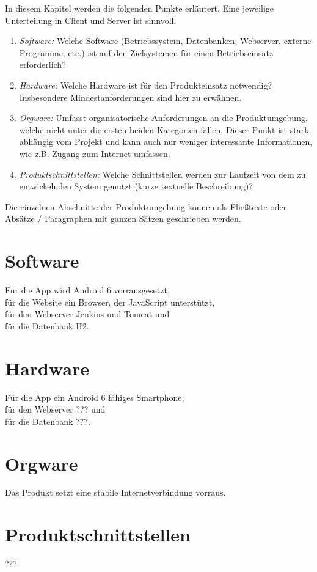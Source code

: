 \begin{tcolorbox}
In diesem Kapitel werden die folgenden Punkte erläutert. Eine jeweilige Unterteilung in Client und Server ist sinnvoll.
\begin{enumerate}
	\item \textit{Software:} Welche Software (Betriebssystem, Datenbanken, Webserver, externe Programme, etc.) ist auf den Zielsystemen für einen Betriebseinsatz erforderlich?
	\item \textit{Hardware:} Welche Hardware ist für den Produkteinsatz notwendig? Insbesondere Mindestanforderungen sind hier zu erwähnen.
	\item \textit{Orgware:} Umfasst organisatorische Anforderungen an die Produktumgebung, welche nicht unter die ersten beiden Kategorien fallen. 
	Dieser Punkt ist stark abhängig vom Projekt und kann auch nur weniger interessante Informationen, wie z.B. Zugang zum Internet umfassen.
	\item \textit{Produktschnittstellen:} Welche Schnittstellen werden zur Laufzeit von dem zu entwickelnden System genutzt (kurze textuelle Beschreibung)?
\end{enumerate}

\noindent Die einzelnen Abschnitte der Produktumgebung können als Fließtexte oder Absätze / Paragraphen mit ganzen Sätzen geschrieben werden.
\end{tcolorbox}

\section{Software}

Für die App wird Android 6 vorrausgesetzt, \\
für die Website ein Browser, der JavaScript unterstützt, \\
für den Webserver Jenkins und Tomcat und \\
für die Datenbank H2.\\

\section{Hardware}

Für die App ein Android 6 fähiges Smartphone, \\
für den Webserver ??? und \\
für die Datenbank ???.

\section{Orgware}

Das Produkt setzt eine stabile Internetverbindung vorraus.

\section{Produktschnittstellen}

???